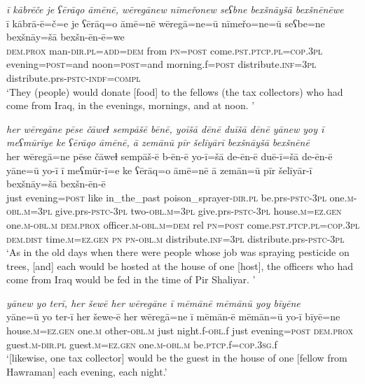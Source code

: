 \ea \label{BP.38}
\textit{ī kābrēče je ʕērāqo āmēnē, wēregānew nīmeřonew seʕbne bexšnāyšā bexšnēnēwe} \\ 
\gll ī kābrā-ē=č=e je ʕērāq=o āmē=nē wēregā=ne=ū nīmeřo=ne=ū seʕbe=ne bexšnāy=šā bexšn-ēn-ē=we \\ 
 \textsc{dem.prox} man\textsc{-dir}\textsc{.pl}\textsc{=add}\textsc{=dem} from \textsc{pn}\textsc{=\textsc{post}} come\textsc{.pst}\textsc{.ptcp}\textsc{.pl}\textsc{=cop}\textsc{.3pl} evening\textsc{=\textsc{post}}=and noon\textsc{=\textsc{post}}=and morning.f\textsc{=\textsc{post}} distribute\textsc{.inf}\textsc{=3pl} distribute.prs\textsc{-pstc}\textsc{-indf}\textsc{=compl} \\ 
\glt `They (people) would donate [food] to the fellows (the tax collectors) who had come from Iraq, in the evenings, mornings, and at noon. '
\z 
 
\ea \label{BP.40}
\textit{her wēregāne pēse čāweɫ sempāšē bēnē, yoīšā dēnē duīšā dēnē yānew yoy ī meʕmūrīye ke ʕērāqo āmēnē, ā zemānū pīr šelīyārī bexšnāyšā bexšnēnē} \\ 
\gll her wēregā=ne pēse čāweɫ sempāš-ē b-ēn-ē yo-ī=šā de-ēn-ē duē-ī=šā de-ēn-ē yāne=ū yo-ī ī meʕmūr-ī=e ke ʕērāq=o āmē=nē ā zemān=ū pīr šelīyār-ī bexšnāy=šā bexšn-ēn-ē \\ 
 just evening\textsc{=\textsc{post}} like in\_the\_past poison\_sprayer\textsc{-dir}\textsc{.pl} be.prs\textsc{-pstc}\textsc{-3pl} one\textsc{.m}\textsc{-obl}\textsc{.m}\textsc{=3pl} give.prs\textsc{-pstc}\textsc{-3pl} two\textsc{-obl}\textsc{.m}\textsc{=3pl} give.prs\textsc{-pstc}\textsc{-3pl} house\textsc{.m}\textsc{=ez.gen} one\textsc{.m}\textsc{-obl}\textsc{.m} \textsc{dem.prox} officer\textsc{.m}\textsc{-obl}\textsc{.m}\textsc{=dem} rel \textsc{pn}\textsc{=\textsc{post}} come\textsc{.pst}\textsc{.ptcp}\textsc{.pl}\textsc{=cop}\textsc{.3pl} \textsc{dem.dist} time\textsc{.m}\textsc{=ez.gen} \textsc{pn} \textsc{pn}\textsc{-obl}\textsc{.m} distribute\textsc{.inf}\textsc{=3pl} distribute.prs\textsc{-pstc}\textsc{-3pl} \\ 
\glt `As in the old days when there were people whose job was spraying pesticide on trees, [and] each would be hosted at the house of one [host], the officers who had come from Iraq would be fed in the time of Pir Shaliyar. '
\z 
 
\ea \label{BP.43}
\textit{yānew yo terī, her šewē her wēregāne ī mēmānē mēmānū yoy bīyēne} \\ 
\gll yāne=ū yo ter-ī her šewe-ē her wēregā=ne ī mēmān-ē mēmān=ū yo-ī bīyē=ne \\ 
 house\textsc{.m}\textsc{=ez.gen} one\textsc{.m} other\textsc{-obl}\textsc{.m} just night.f\textsc{-obl}.f just evening\textsc{=\textsc{post}} \textsc{dem.prox} guest\textsc{.m}\textsc{-dir}\textsc{.pl} guest\textsc{.m}\textsc{=ez.gen} one\textsc{.m}\textsc{-obl}\textsc{.m} be\textsc{.ptcp}.f\textsc{=cop}\textsc{.3sg}.f \\ 
\glt `[likewise, one tax collector] would be the guest in the house of one [fellow from Hawraman]  each evening, each night.'
\z 
 
